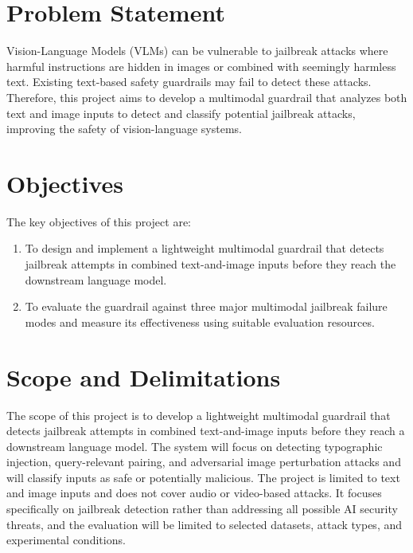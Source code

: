 \section{Problem Statement}
Vision-Language Models (VLMs) can be vulnerable to jailbreak attacks where harmful instructions are hidden in images or combined with seemingly harmless text. Existing text-based safety guardrails may fail to detect these attacks. Therefore, this project aims to develop a multimodal guardrail that analyzes both text and image inputs to detect and classify potential jailbreak attacks, improving the safety of vision-language systems.

\section{Objectives}
The key objectives of this project are:
\begin{enumerate}
    \item To design and implement a lightweight multimodal guardrail that detects jailbreak attempts in combined text-and-image inputs before they reach the downstream language model.
    \item To evaluate the guardrail against three major multimodal jailbreak failure modes and measure its effectiveness using suitable evaluation resources.
\end{enumerate}

\section{Scope and Delimitations}
The scope of this project is to develop a lightweight multimodal guardrail that detects jailbreak attempts in combined text-and-image inputs before they reach a downstream language model. The system will focus on detecting typographic injection, query-relevant pairing, and adversarial image perturbation attacks and will classify inputs as safe or potentially malicious. The project is limited to text and image inputs and does not cover audio or video-based attacks. It focuses specifically on jailbreak detection rather than addressing all possible AI security threats, and the evaluation will be limited to selected datasets, attack types, and experimental conditions.

